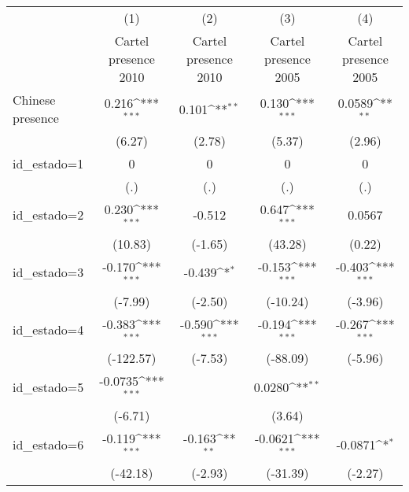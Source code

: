 {
\def\sym#1{\ifmmode^{#1}\else\(^{#1}\)\fi}
\begin{tabular}{l*{4}{c}}
\hline\hline
                    &\multicolumn{1}{c}{(1)}&\multicolumn{1}{c}{(2)}&\multicolumn{1}{c}{(3)}&\multicolumn{1}{c}{(4)}\\
                    &\multicolumn{1}{c}{Cartel presence 2010}&\multicolumn{1}{c}{Cartel presence 2010}&\multicolumn{1}{c}{Cartel presence 2005}&\multicolumn{1}{c}{Cartel presence 2005}\\
\hline
Chinese presence    &       0.216\sym{***}&       0.101\sym{**} &       0.130\sym{***}&      0.0589\sym{**} \\
                    &      (6.27)         &      (2.78)         &      (5.37)         &      (2.96)         \\
[1em]
id\_estado=1         &           0         &           0         &           0         &           0         \\
                    &         (.)         &         (.)         &         (.)         &         (.)         \\
[1em]
id\_estado=2         &       0.230\sym{***}&      -0.512         &       0.647\sym{***}&      0.0567         \\
                    &     (10.83)         &     (-1.65)         &     (43.28)         &      (0.22)         \\
[1em]
id\_estado=3         &      -0.170\sym{***}&      -0.439\sym{*}  &      -0.153\sym{***}&      -0.403\sym{***}\\
                    &     (-7.99)         &     (-2.50)         &    (-10.24)         &     (-3.96)         \\
[1em]
id\_estado=4         &      -0.383\sym{***}&      -0.590\sym{***}&      -0.194\sym{***}&      -0.267\sym{***}\\
                    &   (-122.57)         &     (-7.53)         &    (-88.09)         &     (-5.96)         \\
[1em]
id\_estado=5         &     -0.0735\sym{***}&                     &      0.0280\sym{**} &                     \\
                    &     (-6.71)         &                     &      (3.64)         &                     \\
[1em]
id\_estado=6         &      -0.119\sym{***}&      -0.163\sym{**} &     -0.0621\sym{***}&     -0.0871\sym{*}  \\
                    &    (-42.18)         &     (-2.93)         &    (-31.39)         &     (-2.27)         \\

\end{tabular}}
